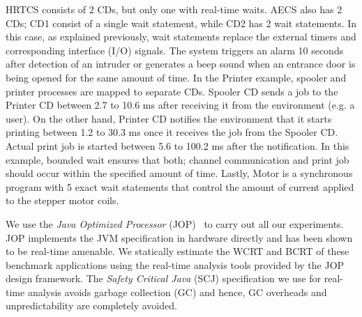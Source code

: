 HRTCS consists of 2 CDs, but only one with real-time waits. AECS also
has 2 CDs; CD1 consist of a single wait statement, while CD2 has 2 wait
statements. In this case, as explained previously, wait statements
replace the external timers and corresponding interface (I/O)
signals. The system triggers an alarm 10 seconds after detection of an
intruder or generates a beep sound when an entrance door is being opened
for the same amount of time. In the Printer example, spooler and printer
processes are mapped to separate CDs. Spooler CD sends a job to the
Printer CD between 2.7 to 10.6 ms after receiving it from the
environment (e.g. a user). On the other hand, Printer CD notifies the
environment that it starts printing between 1.2 to 30.3 ms once it
receives the job from the Spooler CD. Actual print job is started
between 5.6 to 100.2 ms after the notification. In this example, bounded
wait ensures that both; channel communication and print job should occur
within the specified amount of time. Lastly, Motor is a synchronous
program with 5 exact wait statements that control the amount of current
applied to the stepper motor coils.





We use the \textit{Java Optimized Processor}
(JOP)~\cite{jop:jnl:jsa2007} to carry out all our experiments. JOP
implements the JVM specification in hardware directly and has been shown
to be real-time amenable. We statically estimate the WCRT and BCRT of
these benchmark applications using the real-time analysis tools provided
by the JOP design framework. The \textit{Safety Critical Java} (SCJ)
specification we use for real-time analysis avoids garbage collection
(GC) and hence, GC overheads and unpredictability are completely
avoided.

